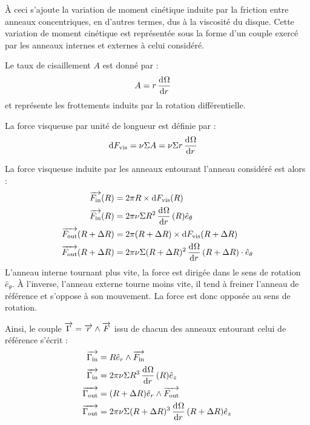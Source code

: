 \bigskip

À ceci s'ajoute la variation de moment cinétique induite par la friction entre anneaux concentriques, en d'autres termes, dus à la viscosité du disque. Cette variation de moment cinétique est représentée sous la forme d'un couple exercé par les anneaux internes et externes à celui considéré. 

Le taux de cisaillement $A$ est donné par : 
\begin{align}
A &= r \mathinner{ \dfrac{\operatorname{d \!}{^{}}\Omega}{\operatorname{d \!}{{r}^{}}} }
\end{align}
et représente les frottements induits par la rotation différentielle.

La force visqueuse par unité de longueur est définie par :
\begin{align}
\operatorname{d \!} F_\text{vis} &= \nu \Sigma A = \nu \Sigma r \mathinner{ \dfrac{\operatorname{d \!}{^{}}\Omega}{\operatorname{d \!}{{r}^{}}} }
\end{align}

La force visqueuse induite par les anneaux entourant l'anneau considéré est alors : 
\begin{subequations}
\begin{align}
\vect{F_\text{in}}(R) &= 2\pi R \times \dif F_\text{vis}(R) \nonumber\\
\vect{F_\text{in}}(R)&= 2\pi\nu \Sigma R^2 \dod{\Omega}{r}(R) \hat{e}_\theta\\
\vect{F_\text{out}}(R+\Delta R) &= 2\pi (R+\Delta R) \times \dif F_\text{vis}(R+\Delta R) \nonumber\\
\vect{F_\text{out}}(R+\Delta R)&= 2\pi\nu \Sigma (R+\Delta R)^2 \dod{\Omega}{r}(R+\Delta R) \cdot \hat{e}_\theta
\end{align}
\end{subequations}
L'anneau interne tournant plus vite, la force est dirigée dans le sens de rotation $\hat{e}_\theta$. À l'inverse, l'anneau externe tourne moins vite, il tend à freiner l'anneau de référence et s'oppose à son mouvement. La force est donc opposée au sens de rotation.

\bigskip

Ainsi, le couple ${\overrightarrow{\Gamma}}={\overrightarrow{r}}\wedge{\overrightarrow{F}}$ issu de chacun des anneaux entourant celui de référence s'écrit :
\begin{subequations}
\begin{align}
\vect{\Gamma_\text{in}} &= R\hat{e}_r\wedge\vect{F_\text{in}}\nonumber\\
\vect{\Gamma_\text{in}} &= 2\pi\nu \Sigma R^3 \dod{\Omega}{r}(R) \hat{e}_z\label{eq:G_in2}\\
\vect{\Gamma_\text{out}} &= (R+\Delta R)\hat{e}_r\wedge\vect{F_\text{out}}\nonumber\\
\vect{\Gamma_\text{out}} &= 2\pi\nu \Sigma (R+\Delta R)^3 \dod{\Omega}{r}(R+\Delta R) \hat{e}_z\label{eq:G_out2}
\end{align}\label{eq:J_torques2}
\end{subequations}

